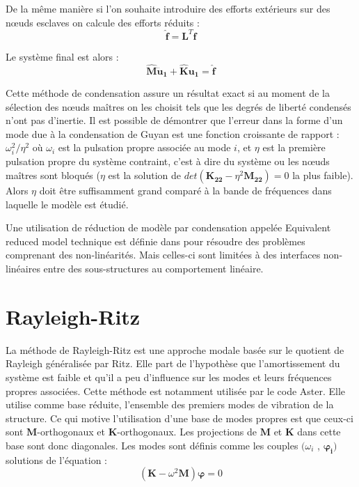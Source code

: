 \documentclass[12pt,a4paper]{report}
\begin{document}
\noindent
De la même manière si l'on souhaite introduire des efforts extérieurs sur des nœuds esclaves on calcule des efforts réduits :
\begin{equation}
	\hat{\mathbf{f}} = \mathbf{L}^T \mathbf{f}
\end{equation}

\noindent
Le système final est alors :
\begin{equation}
	\mathbf{\hat{M}} \mathbf{\ddot{u}_1}
	 + \mathbf{\hat{K}} \mathbf{u_1}
	 = \mathbf{\hat{f}}
\end{equation}

Cette méthode de condensation assure un résultat exact si au moment de la sélection des nœuds maîtres on les choisit tels que les degrés de liberté condensés n'ont pas d'inertie. Il est possible de démontrer que l'erreur dans la forme d'un mode due à la condensation de Guyan est une fonction croissante de rapport : $\omega_i^2/\eta^2$
où $\omega_i$ est la pulsation propre associée au mode $i$, et $\eta$ est la première pulsation propre du système contraint, c'est à dire du système ou les nœuds maîtres sont bloqués ($\eta$ est la solution de $det( \mathbf{K_{22}} - \eta^2 \mathbf{M_{22}}) = 0$ la plus faible). Alors $\eta$ doit être suffisamment grand comparé à la bande de fréquences dans laquelle le modèle est étudié.

Une utilisation de réduction de modèle par condensation appelée Equivalent reduced model technique est définie dans \cite{ERMT} pour résoudre des problèmes comprenant des non-linéarités. Mais celles-ci sont limitées à des interfaces non-linéaires entre des sous-structures au comportement linéaire.

\section{Rayleigh-Ritz}
\label{IntroRR}
La méthode de Rayleigh-Ritz est une approche modale basée sur le quotient de Rayleigh généralisée par Ritz. Elle part de l'hypothèse que l'amortissement du système est faible et qu'il a peu d'influence sur les modes et leurs fréquences propres associées. Cette méthode est notamment utilisée par le code Aster. Elle utilise comme base réduite, l'ensemble des premiers modes de vibration de la structure. Ce qui motive l'utilisation d'une base de modes propres est que ceux-ci sont $\mathbf{M}$-orthogonaux et $\mathbf{K}$-orthogonaux. Les projections de $\mathbf{M}$ et $\mathbf{K}$ dans cette base sont donc diagonales.
Les modes sont définis comme les couples $(\omega_i$ , $\boldsymbol{\varphi_i})$ solutions de l'équation :
\begin{equation}
(\mathbf{K} - \omega^2 \mathbf{M})\boldsymbol{\varphi} = 0
\end{equation}
\end{document}
